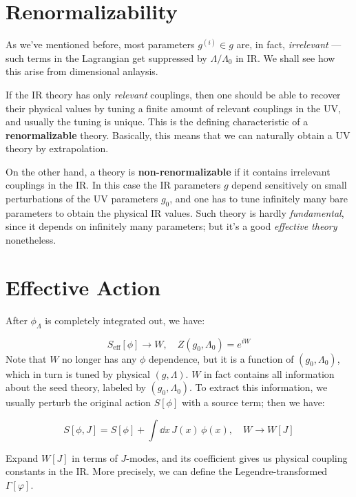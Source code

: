 \documentclass[a4paper
	,10pt
]{article}
\begin{document}
\section{Renormalizability}
	As we've mentioned before, most parameters $g^{(i)} \in g$ are, in fact, \emph{irrelevant} --- such terms in the Lagrangian get suppressed by $\Lambda/\Lambda_0$ in IR. We shall see how this arise from dimensional anlaysis.
	
	
	
	If the IR theory has only \emph{relevant} couplings, then one should be
	able to recover their physical values by tuning a finite amount of
	relevant couplings in the UV, and usually the tuning is unique. This is
	the defining characteristic of a \textbf{renormalizable} theory.
	Basically, this means that we can naturally obtain a UV theory by
	extrapolation.
	
	On the other hand, a theory is \textbf{non-renormalizable} if it
	contains irrelevant couplings in the IR. In this case the IR parameters
	$g$ depend sensitively on small perturbations of the UV parameters
	$g_0$, and one has to tune infinitely many bare parameters to obtain
	the physical IR values. Such theory is hardly \emph{fundamental}, since
	it depends on infinitely many parameters; but it's a good
	\emph{effective theory} nonetheless.
	
\section{Effective Action}
	After $\phi_\Lambda$ is completely integrated out, we
	have:
	
	\begin{equation}
	  S_{\mathrm{eff}}[\phi] \to W,\quad
	  Z(g_0,\Lambda_0) = e^{iW}
	\end{equation}
	Note that $W$ no longer has any $\phi$ dependence, but it is a
	function of $(g_0,\Lambda_0)$, which in turn is tuned by physical
	$(g,\Lambda)$. $W$ in fact contains all information about the seed
	theory, labeled by $(g_0,\Lambda_0)$. To extract this information, we
	usually perturb the original action $S[\phi]$ with a source term; then
	we have:
	
	\begin{equation}
	  S[\phi,J]
	  = S[\phi] + \int \dd{x}\,J(x)\,\phi(x),\quad
	  W \to W[J]
	\end{equation}
	
	Expand $W[J]$ in terms of $J$-modes, and its coefficient gives us
	physical coupling constants in the IR. More precisely, we can define the Legendre-transformed $\Gamma[\varphi]$.


\printbibliography[%
	,heading = bibintoc
]
\end{document}
